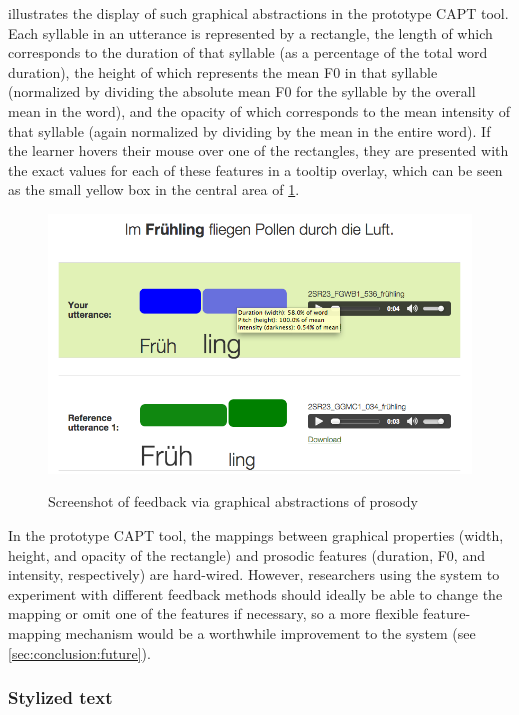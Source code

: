 			 illustrates the display of such graphical abstractions in the prototype CAPT tool. Each syllable in an utterance is represented by a rectangle, the length of which corresponds to the duration of that syllable (as a percentage of the total word duration), the height of which represents the mean F0 in that syllable (normalized by dividing the absolute mean F0 for the syllable by the overall mean in the word), and the opacity of which corresponds to the mean intensity of that syllable (again normalized by dividing by the mean in the entire word). If the learner hovers their mouse over one of the rectangles, they are presented with the exact values for each of these features in a tooltip overlay, which can be seen as the small yellow box in the central area of \cref{fig:rectangles}.
			
				\begin{figure}
					\centering
					\caption[Feedback via graphical abstractions of prosody]{Screenshot of feedback via graphical abstractions of prosody}
					\includegraphics[width=\textwidth]{img/screenshots/rectanglesWithOpacity}
					\label{fig:rectangles}
				\end{figure}			
			
			In the prototype CAPT tool, the mappings between graphical properties (width, height, and opacity of the rectangle) and prosodic features (duration, F0, and intensity, respectively) are hard-wired. However, researchers using the system to experiment with different feedback methods should ideally be able to change the mapping or omit one of the features if necessary, so a more flexible feature-mapping mechanism would be a worthwhile improvement to the system (see \cref{sec:conclusion:future}).
			
			
			\subsubsection{Stylized text}
			\label{sec:implicit:visual:text}
			
